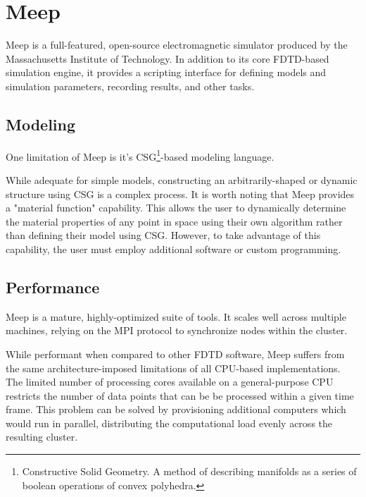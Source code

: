 \chapter{Meep} \label{ch:meep}

Meep\cite{OskooiRo10} is a full-featured, open-source electromagnetic simulator produced by the Massachusetts Institute of Technology. In addition to its core FDTD-based simulation engine, it provides a scripting interface for defining models and simulation parameters, recording results, and other tasks.  





\section{Modeling}

\iffalse
************************************************
While I may agree, you need to keep they hyperbole and sarcasm out.  You should re-write this section to state what Meep is, how it is used, and how you made use of some of it's features.  You can also look up how many citations it has (on their website) to showcase that it's widely used and trusted making it a valid point of comparison 
************************************************
\fi

One limitation of Meep is it's CSG\footnote{Constructive Solid Geometry. A method of describing manifolds as a series of boolean operations of convex polyhedra.}-based modeling language. 

While adequate for simple models, constructing an arbitrarily-shaped or dynamic structure using CSG is a complex process. It is worth noting that Meep provides a "material function" capability. This allows the user to dynamically determine the material properties of any point in space using their own algorithm rather than defining their model using CSG. However, to take advantage of this capability, the user must employ additional software or custom programming. 

\section{Performance}

Meep is a mature, highly-optimized suite of tools. It scales well across multiple machines, relying on the MPI protocol to synchronize nodes within the cluster.

While performant when compared to other FDTD software, Meep suffers from the same architecture-imposed limitations of all CPU-based implementations. The limited number of processing cores available on a general-purpose CPU restricts the number of data points that can be be processed within a given time frame. This problem can be solved by provisioning additional computers which would run in parallel, distributing the computational load evenly across the resulting cluster.

